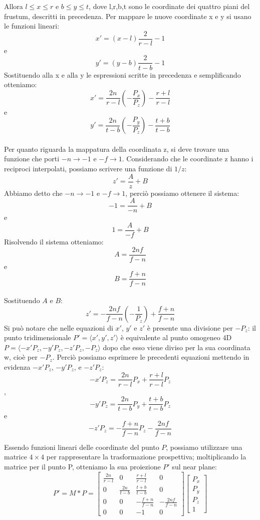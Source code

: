 Allora $l\leq x\leq r$ e $b\leq y\leq t$, dove l,r,b,t sono le coordinate dei quattro piani del frustum, descritti in precedenza.
Per mappare le nuove coordinate x e y si usano le funzioni lineari:
$$x'=(x-l)\frac{2}{r-l}-1$$ e $$y'=(y-b)\frac{2}{t-b}-1$$
Sostituendo alla x e alla y le espressioni scritte in precedenza e semplificando otteniamo:
$$x'=\frac{2n}{r-l}\left(-\frac{P_x}{P_z}\right)-\frac{r+l}{r-l}$$ e 
$$y'=\frac{2n}{t-b}\left(-\frac{P_y}{P_z}\right)-\frac{t+b}{t-b}$$\\
Per quanto riguarda la mappatura della coordinata z, si deve trovare una funzione che porti $-n\rightarrow -1$ e $-f\rightarrow 1$.
Considerando che le coordinate z hanno i reciproci interpolati, possiamo scrivere una funzione di $1/z$:
$$z'=\frac{A}{z}+B$$
Abbiamo detto che $-n\rightarrow -1$ e $-f\rightarrow 1$, perciò possiamo ottenere il sistema:
$$-1=\frac{A}{-n}+B$$ e $$1=\frac{A}{-f}+B$$
Risolvendo il sistema otteniamo:
$$A=\frac{2nf}{f-n}$$ e $$B=\frac{f+n}{f-n}$$\\
Sostituendo $A$ e $B$:
$$z'=-\frac{2nf}{f-n}\left(-\frac{1}{P_z}\right)+\frac{f+n}{f-n}$$
Si può notare che nelle equazioni di $x'$, $y'$ e $z'$ è presente una divisione per $-P_z$: il punto tridimensionale $P'=\langle x',y',z'\rangle$ è equivalente al punto omogeneo 4D $P=\langle -x'P_z,-y'P_z,-z'P_z,-P_z\rangle$ dopo che esso viene diviso per la sua coordinata w, cioè per $-P_z$.
Perciò possiamo esprimere le precedenti equazioni mettendo in evidenza $-x'P_z$, $-y'P_z$, e $-z'P_z$:
$$-x'P_z=\frac{2n}{r-l}P_x+\frac{r+l}{r-l}P_z$$, 
$$-y'P_z=\frac{2n}{t-b}P_y+\frac{t+b}{t-b}P_z$$e
$$-z'P_z=-\frac{f+n}{f-n}P_z-\frac{2nf}{f-n}$$

Essendo funzioni lineari delle coordinate del punto $P$, possiamo utilizzare una matrice $4\times 4$ per rappresentare la trasformazione prospettiva; moltiplicando la matrice per il punto P, otteniamo la sua proiezione $P'$ sul near plane:
$$P'=M*P=
\begin{bmatrix}
\frac{2n}{r-l} & 0 & \frac{r+l}{r-l} & 0 \\
0 & \frac{2n}{t-b} & \frac{t+b}{t-b} & 0 \\
0 & 0 & -\frac{f+n}{f-n} & -\frac{2nf}{f-n} \\
0 & 0 & -1 & 0
\end{bmatrix}
\begin{bmatrix}
P_x \\ P_y \\ P_z \\ 1
\end{bmatrix}$$

